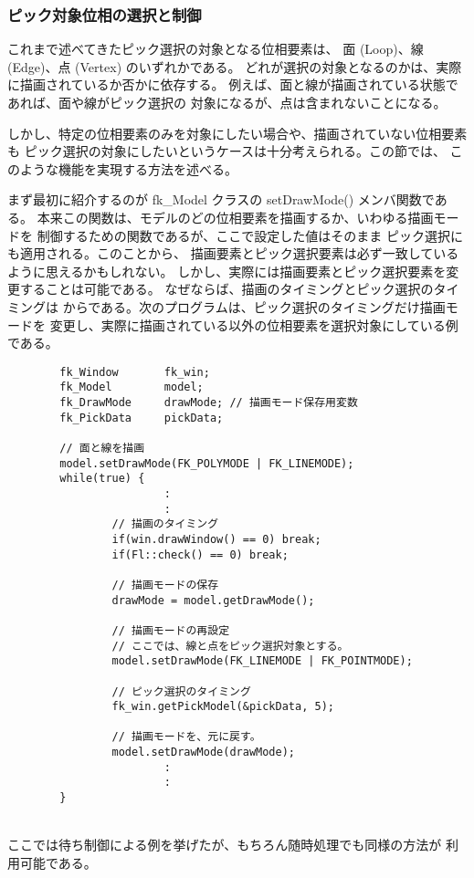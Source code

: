 \subsubsection{ピック対象位相の選択と制御} \label{sec:picktype}
これまで述べてきたピック選択の対象となる位相要素は、
面 (Loop)、線 (Edge)、点 (Vertex) のいずれかである。
どれが選択の対象となるのかは、実際に描画されているか否かに依存する。
例えば、面と線が描画されている状態であれば、面や線がピック選択の
対象になるが、点は含まれないことになる。

しかし、特定の位相要素のみを対象にしたい場合や、描画されていない位相要素も
ピック選択の対象にしたいというケースは十分考えられる。この節では、
このような機能を実現する方法を述べる。

まず最初に紹介するのが fk\_Model クラスの setDrawMode() メンバ関数である。
本来この関数は、モデルのどの位相要素を描画するか、いわゆる描画モードを
制御するための関数であるが、ここで設定した値はそのまま
ピック選択にも適用される。このことから、
描画要素とピック選択要素は必ず一致しているように思えるかもしれない。
しかし、実際には描画要素とピック選択要素を変更することは可能である。
なぜならば、描画のタイミングとピック選択のタイミングは
からである。次のプログラムは、ピック選択のタイミングだけ描画モードを
変更し、実際に描画されている以外の位相要素を選択対象にしている例である。
\\
\begin{breakbox}
\begin{verbatim}
        fk_Window       fk_win;
        fk_Model        model;
        fk_DrawMode     drawMode; // 描画モード保存用変数
        fk_PickData     pickData;

        // 面と線を描画
        model.setDrawMode(FK_POLYMODE | FK_LINEMODE);
        while(true) {
                        :
                        :
                // 描画のタイミング
                if(win.drawWindow() == 0) break;
                if(Fl::check() == 0) break;

                // 描画モードの保存
                drawMode = model.getDrawMode();

                // 描画モードの再設定
                // ここでは、線と点をピック選択対象とする。
                model.setDrawMode(FK_LINEMODE | FK_POINTMODE);

                // ピック選択のタイミング
                fk_win.getPickModel(&pickData, 5);

                // 描画モードを、元に戻す。
                model.setDrawMode(drawMode);
                        :
                        :
        }
\end{verbatim}
\end{breakbox}
~ \\
ここでは待ち制御による例を挙げたが、もちろん随時処理でも同様の方法が
利用可能である。

